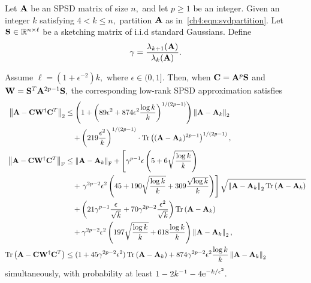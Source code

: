 \begin{thm}
Let $\mathbf{A}$ be an SPSD matrix of size $n,$ and let $p\geq 1$ be an integer. Given
an integer $k$ satisfying $4 < k \leq n,$ partition $\mathbf{A}$ as in~\eqref{ch4:eqn:svdpartition}. Let 
$\mathbf{S} \in \mathbb{R}^{n \times \ell}$ be a sketching matrix of i.i.d standard Gaussians. 
Define 
\[
 \gamma = \frac{\lambda_{k+1}(\mathbf{A})}{\lambda_k(\mathbf{A})}.
\]

Assume $\ell = (1 + \epsilon^{-2})k,$ where $\epsilon \in (0,1].$ 
Then, when $\mathbf{C} = \mathbf{A}^p \mathbf{S}$ and 
$\mathbf{W} = \mathbf{S}^T \mathbf{A}^{2p-1} \mathbf{S},$ the corresponding low-rank SPSD 
approximation satisfies
\begin{align*}
  \TNorm{\matA - \matC \matW^\pinv \matC\transp} & \leq \left(1 
    + \left(89\epsilon^2 
            + 874 \epsilon^2 \frac{\log k}{k} \right)^{1/(2p-1)} 
   \right) \TNorm{\matA - \matA_k} \\ 
  & \quad + \left( 219 \frac{\epsilon^2}{k} \right)^{1/(2p-1)} 
    \cdot \tracenorm{(\matA - \matA_k)^{2p-1}}^{1/(2p-1)}  , \\
% 
 \FNorm{\matA - \matC \matW^\pinv \matC\transp}  & \leq
   \FNorm{\matA - \matA_k} + \left[ 
   \gamma^{p-1}\epsilon \left(5 + 6 \sqrt{\frac{\log k}{k}} \right) \right. \\
  & \quad + \left. \gamma^{2p-2} \epsilon^2 
    \left(45 + 
        190 \sqrt{\frac{\log k}{k}} + 309 \frac{\sqrt{\log k}}{k}
     \right) \right]  
     \sqrt{\TNorm{\matA - \matA_k} \tracenorm{\matA - \matA_k}} \\
  & \quad + \left( 21 \gamma^{p-1}\frac{\epsilon}{\sqrt{k}} 
                   + 70 \gamma^{2p-2} \frac{\epsilon^2}{\sqrt{k}} \right)
            \tracenorm{\matA - \matA_k} \\
  & \quad + \gamma^{2p-2} \epsilon^2 \left(197 \sqrt{\frac{\log k}{k}} 
                                 + 618 \frac{\log k}{k} \right) 
            \TNorm{\matA - \matA_k}, \\
%
 \tracenorm{\matA - \matC \matW^\pinv \matC\transp} & \leq 
 (1 + 45 \gamma^{2p-2} \epsilon^2) \tracenorm{\matA - \matA_k}
 + 874 \gamma^{2p-2} \epsilon^2 \frac{\log k}{k} \TNorm{\matA - \matA_k}
\end{align*}
simultaneously, with probability at least $1 - 2 k^{-1} - 4 \mathrm{e}^{-k/\epsilon^2}.$
\label{ch4:thm:proj-gaussian}
\end{thm}

